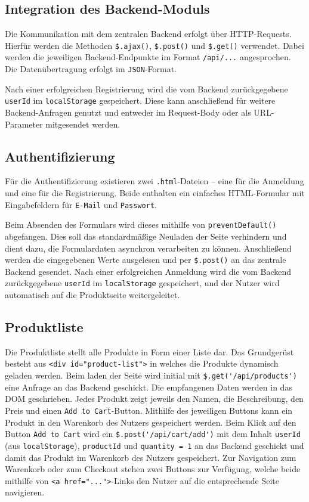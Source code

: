 \documentclass[oneside]{ausarbeitung}
\begin{document}
\subsection{Integration des Backend-Moduls}

Die Kommunikation mit dem zentralen Backend erfolgt über \ac{HTTP}-Requests. Hierfür werden die Methoden \verb|$.ajax()|, \verb|$.post()| und \verb|$.get()| verwendet. Dabei werden die jeweiligen Backend-Endpunkte im Format \texttt{/api/...} angesprochen. Die Datenübertragung erfolgt im \texttt{JSON}-Format.

Nach einer erfolgreichen Registrierung wird die vom Backend zurückgegebene \texttt{userId} im \texttt{localStorage} gespeichert. Diese kann anschließend für weitere Backend-Anfragen genutzt und entweder im Request-Body oder als URL-Parameter mitgesendet werden.

\subsection{Authentifizierung}

Für die Authentifizierung existieren zwei \texttt{.html}-Dateien – eine für die Anmeldung und eine für die Registrierung. Beide enthalten ein einfaches \ac{HTML}-Formular mit Eingabefeldern für \texttt{E-Mail} und \texttt{Passwort}.

Beim Absenden des Formulars wird dieses mithilfe von \texttt{preventDefault()} abgefangen. Dies soll das standardmäßige Neuladen der Seite verhindern und dient dazu, die Formulardaten asynchron verarbeiten zu können. Anschließend werden die eingegebenen Werte ausgelesen und per \verb|$.post()| an das zentrale Backend gesendet. Nach einer erfolgreichen Anmeldung wird die vom Backend zurückgegebene \texttt{userId} im \texttt{localStorage} gespeichert, und der Nutzer wird automatisch auf die Produktseite weitergeleitet.

\subsection{Produktliste}

Die Produktliste stellt alle Produkte in Form einer Liste dar. Das Grundgerüst besteht aus \texttt{<div id="product-list">} in welches die Produkte dynamisch geladen werden. Beim laden der Seite wird initial mit \verb|$.get('/api/products')| eine Anfrage an das Backend geschickt. Die empfangenen Daten werden in das DOM geschrieben. Jedes Produkt zeigt jeweils den Namen, die Beschreibung, den Preis und einen \texttt{Add to Cart}-Button. 
Mithilfe des jeweiligen Buttons kann ein Produkt in den Warenkorb des Nutzers gespeichert werden. Beim Klick auf den Button \texttt{Add to Cart} wird ein \verb|$.post('/api/cart/add')| mit dem Inhalt \texttt{userId} (aus \texttt{localStorage}), \texttt{productId} und \texttt{quantity = 1} an das Backend geschickt und damit das Produkt im Warenkorb des Nutzers gespeichert.
Zur Navigation zum Warenkorb oder zum Checkout stehen zwei Buttons zur Verfügung, welche beide mithilfe von \texttt{<a href="...">}-Links den Nutzer auf die entsprechende Seite navigieren. 
\end{document}
